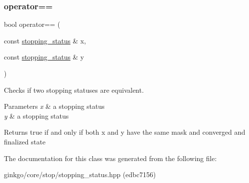 \subsubsection{\texorpdfstring{operator==}{operator==}}
{\footnotesize\ttfamily bool operator== (\begin{DoxyParamCaption}\item[{const \hyperlink{classgko_1_1stopping__status}{stopping\+\_\+status} \&}]{x,  }\item[{const \hyperlink{classgko_1_1stopping__status}{stopping\+\_\+status} \&}]{y }\end{DoxyParamCaption})\hspace{0.3cm}{\ttfamily [friend]}}



Checks if two stopping statuses are equivalent. 


\begin{DoxyParams}{Parameters}
{\em x} & a stopping status \\
\hline
{\em y} & a stopping status\\
\hline
\end{DoxyParams}
\begin{DoxyReturn}{Returns}
true if and only if both {\ttfamily x} and {\ttfamily y} have the same mask and converged and finalized state 
\end{DoxyReturn}


The documentation for this class was generated from the following file\+:\begin{DoxyCompactItemize}
\item 
ginkgo/core/stop/stopping\+\_\+status.\+hpp (edbc7156)\end{DoxyCompactItemize}
